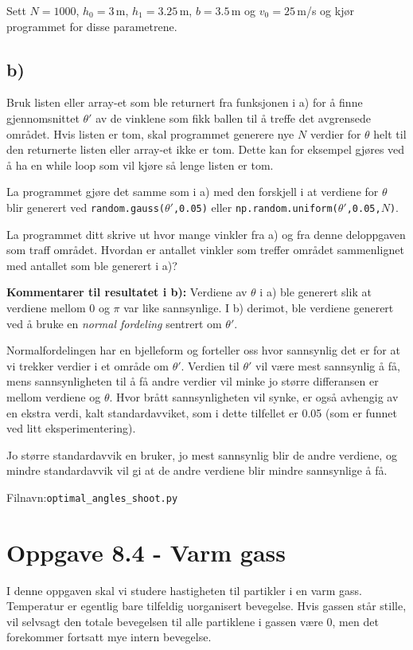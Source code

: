 \documentclass[10pt,a4paper]{article}
\begin{document}
Sett $N = 1000$, $h_0 = 3\,$m, $h_1 = 3.25\,$m, $b = 3.5\,$m og $v_0 = 25\,$m/s og kjør programmet for disse parametrene. 
\subsection*{b)}
Bruk listen eller array-et som ble returnert fra funksjonen i a) for å finne gjennomsnittet $\theta'$ av de vinklene som fikk ballen til å treffe det avgrensede området. Hvis listen er tom, skal programmet generere nye $N$ verdier for $\theta$ helt til den returnerte listen eller array-et ikke er tom. Dette kan for eksempel gjøres ved å ha en while loop som vil kjøre så lenge listen er tom. 
 
La programmet gjøre det samme som i a) med den forskjell i at verdiene for $\theta$ blir generert ved \texttt{random.gauss($\theta'$,0.05)} eller \texttt{np.random.uniform($\theta'$,0.05,$N$)}. 
 
La programmet ditt skrive ut hvor mange vinkler fra a) og fra denne deloppgaven som traff området. Hvordan er antallet vinkler som treffer området sammenlignet med antallet som ble generert i a)?
 
\textbf{Kommentarer til resultatet i b):} Verdiene av $\theta$ i a) ble generert slik at verdiene mellom 0 og $\pi$ var like sannsynlige. I b) derimot, ble verdiene generert ved å bruke en \textit{normal fordeling} sentrert om $\theta'$. 

Normalfordelingen har en bjelleform og forteller oss hvor sannsynlig det er for at vi trekker verdier i et område om $\theta'$.  
Verdien til $\theta'$ vil være mest sannsynlig å få, mens sannsynligheten til å få andre verdier vil minke jo større differansen er mellom verdiene og $\theta$. Hvor brått sannsynligheten vil synke, er også avhengig av en ekstra verdi, kalt standardavviket, som i dette tilfellet er 0.05 (som er funnet ved litt eksperimentering).  

Jo større standardavvik en bruker, jo mest sannsynlig blir de andre verdiene, og mindre standardavvik vil gi at de andre verdiene blir mindre sannsynlige å få. 
 
Filnavn:\texttt{optimal\_angles\_shoot.py}
 


\section*{Oppgave 8.4 - Varm gass}
I denne oppgaven skal vi studere hastigheten til partikler i en varm gass. Temperatur er egentlig bare tilfeldig uorganisert bevegelse. Hvis gassen står stille, vil selvsagt den totale bevegelsen til alle partiklene i gassen være 0, men det forekommer fortsatt mye intern bevegelse.
 
\end{document}
